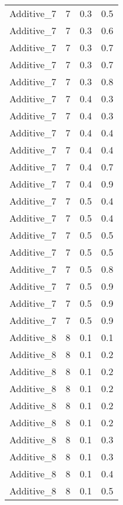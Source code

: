 \documentclass{article}
\begin{document}
\begin{longtable}[H]{lrrr}
 Additive\_7 &       7 &   0.3 &            0.5 \\
 Additive\_7 &       7 &   0.3 &            0.6 \\
 Additive\_7 &       7 &   0.3 &            0.7 \\
 Additive\_7 &       7 &   0.3 &            0.7 \\
 Additive\_7 &       7 &   0.3 &            0.8 \\
 Additive\_7 &       7 &   0.4 &            0.3 \\
 Additive\_7 &       7 &   0.4 &            0.3 \\
 Additive\_7 &       7 &   0.4 &            0.4 \\
 Additive\_7 &       7 &   0.4 &            0.4 \\
 Additive\_7 &       7 &   0.4 &            0.7 \\
 Additive\_7 &       7 &   0.4 &            0.9 \\
 Additive\_7 &       7 &   0.5 &            0.4 \\
 Additive\_7 &       7 &   0.5 &            0.4 \\
 Additive\_7 &       7 &   0.5 &            0.5 \\
 Additive\_7 &       7 &   0.5 &            0.5 \\
 Additive\_7 &       7 &   0.5 &            0.8 \\
 Additive\_7 &       7 &   0.5 &            0.9 \\
 Additive\_7 &       7 &   0.5 &            0.9 \\
 Additive\_7 &       7 &   0.5 &            0.9 \\
 Additive\_8 &       8 &   0.1 &            0.1 \\
 Additive\_8 &       8 &   0.1 &            0.2 \\
 Additive\_8 &       8 &   0.1 &            0.2 \\
 Additive\_8 &       8 &   0.1 &            0.2 \\
 Additive\_8 &       8 &   0.1 &            0.2 \\
 Additive\_8 &       8 &   0.1 &            0.2 \\
 Additive\_8 &       8 &   0.1 &            0.3 \\
 Additive\_8 &       8 &   0.1 &            0.3 \\
 Additive\_8 &       8 &   0.1 &            0.4 \\
 Additive\_8 &       8 &   0.1 &            0.5 \\

\end{longtable}
\end{document}
